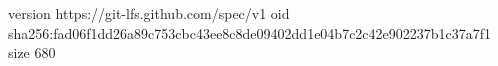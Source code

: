 version https://git-lfs.github.com/spec/v1
oid sha256:fad06f1dd26a89c753cbc43ee8c8de09402dd1e04b7c2c42e902237b1c37a7f1
size 680
